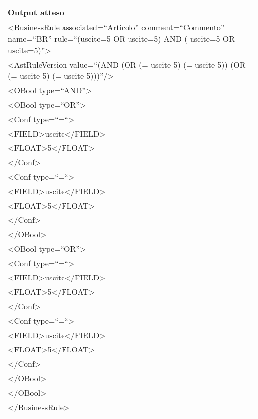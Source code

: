\begin{center}
\begin{tabular}{|p{11cm}|} \hline
\textbf{Output atteso}\\ \hline
\textless BusinessRule associated=``Articolo'' comment=``Commento'' name=``BR'' rule=``(uscite=5 OR uscite=5)  AND ( uscite=5 OR uscite=5)''\textgreater\\
 \textless AstRuleVersion value=``(AND (OR (= uscite 5) (= uscite 5)) (OR (= uscite 5) (= uscite 5)))''/\textgreater \\
\textless OBool type=``AND''\textgreater\\
\textless OBool type=``OR''\textgreater\\
\textless Conf type=``=``\textgreater \\
\textless FIELD\textgreater uscite\textless /FIELD\textgreater\\
 \textless FLOAT\textgreater 5\textless /FLOAT\textgreater\\
 \textless /Conf\textgreater\\
\textless Conf type=``=``\textgreater \\
\textless FIELD\textgreater uscite\textless /FIELD\textgreater\\
 \textless FLOAT\textgreater 5\textless /FLOAT\textgreater\\
 \textless /Conf\textgreater\\
\textless /OBool\textgreater \\
\textless OBool type=``OR''\textgreater\\
\textless Conf type=``=``\textgreater \\
\textless FIELD\textgreater uscite\textless /FIELD\textgreater\\
 \textless FLOAT\textgreater 5\textless /FLOAT\textgreater\\
 \textless /Conf\textgreater\\
\textless Conf type=``=``\textgreater \\
\textless FIELD\textgreater uscite\textless /FIELD\textgreater\\
 \textless FLOAT\textgreater 5\textless /FLOAT\textgreater\\
 \textless /Conf\textgreater\\
\textless /OBool\textgreater \\
\textless /OBool\textgreater \\
\textless /BusinessRule\textgreater \\
 \hline
\end{tabular} \\
\end{center}

